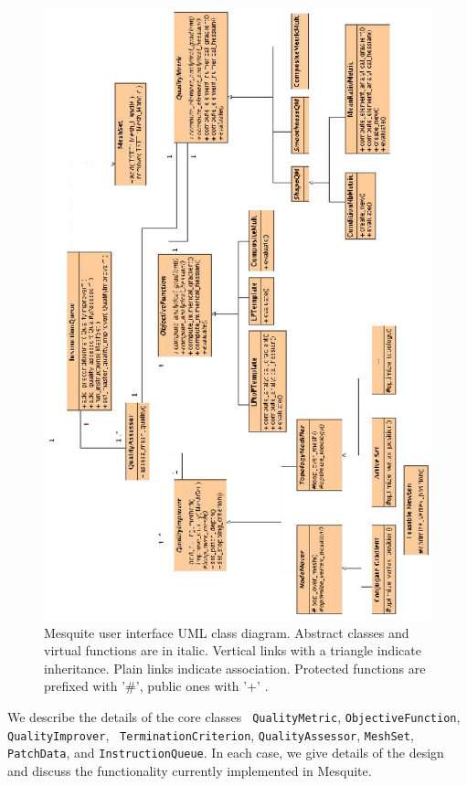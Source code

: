 \documentclass[letter]{report}
\begin{document}
\begin{figure}[htbp]
\begin{center}
    \includegraphics{MesquiteUI.eps}
    \caption{Mesquite user interface UML class diagram.  Abstract
             classes and virtual functions are in italic. Vertical
             links with a triangle indicate inheritance. Plain links
             indicate association. Protected functions are prefixed
             with '\#', public ones with '+' .}
    \label{fig:uml}
\end{center}
\end{figure}

We describe the details of the core classes {\tt
QualityMetric}, {\tt ObjectiveFunction}, {\tt QualityImprover}, {\tt
TerminationCriterion}, {\tt QualityAssessor}, {\tt MeshSet}, {\tt
PatchData}, and {\tt InstructionQueue}.
In each case, we give details
of the design and discuss the functionality currently implemented in
Mesquite.
\end{document}
